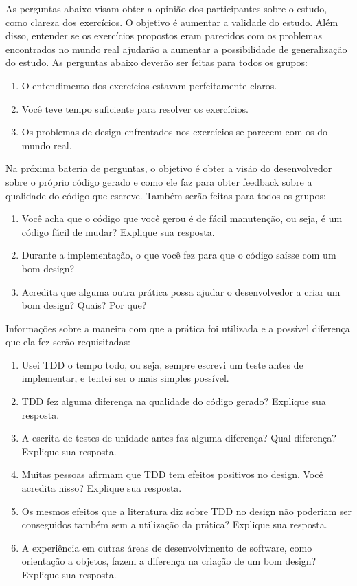 As perguntas abaixo visam obter a opinião dos participantes sobre o estudo, como clareza dos
exercícios. O objetivo é aumentar a validade do estudo.
Além disso, entender se os exercícios propostos eram parecidos com os problemas encontrados no mundo
real ajudarão a aumentar a possibilidade de generalização do estudo. As perguntas abaixo deverão
ser feitas para todos os grupos:

\begin{enumerate}
	\item O entendimento dos exercícios estavam perfeitamente claros.
	\item Você teve tempo suficiente para resolver os exercícios.
	\item Os problemas de design enfrentados nos exercícios se parecem com os do mundo real.
\end{enumerate}

Na próxima bateria de perguntas, o objetivo é obter a visão do desenvolvedor sobre o próprio código gerado e como ele
faz para obter feedback sobre a qualidade do código que escreve. Também serão feitas para todos os grupos:

\begin{enumerate}
	\item Você acha que o código que você gerou é de fácil manutenção, ou seja, é um código fácil de mudar? Explique sua resposta.
	\item Durante a implementação, o que você fez para que o código saísse com um bom design?
	\item Acredita que alguma outra prática possa ajudar o desenvolvedor a criar um bom design? Quais? Por que?
\end{enumerate}

Informações sobre a maneira com que a prática foi utilizada e a possível
diferença que ela fez serão requisitadas:

\begin{enumerate}
	\item Usei TDD o tempo todo, ou seja, sempre escrevi um teste antes de implementar, e tentei ser o mais simples possível.
	\item TDD fez alguma diferença na qualidade do código gerado? Explique sua resposta.
	\item A escrita de testes de unidade antes faz alguma diferença? Qual diferença? Explique sua resposta.
	\item Muitas pessoas afirmam que TDD tem efeitos positivos no design. Você acredita nisso? Explique sua resposta.
	\item Os mesmos efeitos que a literatura diz sobre TDD no design não poderiam ser conseguidos também sem a utilização da prática? Explique sua resposta.
	\item A experiência em outras áreas de desenvolvimento de software, como orientação a objetos, fazem a diferença na criação de um bom design? Explique sua resposta.
\end{enumerate}

